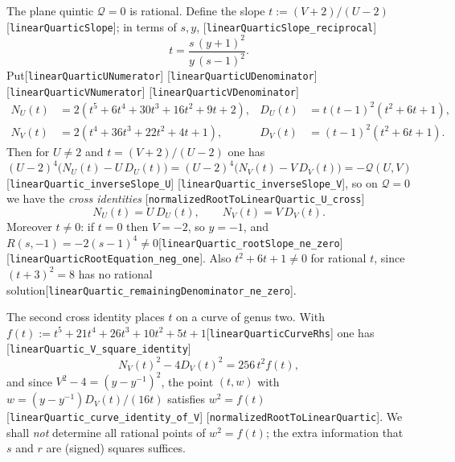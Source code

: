 \documentclass[10pt]{article}
\theoremstyle{definition}
\theoremstyle{remark}
\newcommand{\leanref}[1]{{\scriptsize\textup{[\texttt{#1}]}}\allowbreak}
\begin{document}
The plane quintic $\mathcal{Q}=0$ is rational.  Define the slope
$t:=(V+2)/(U-2)$\leanref{linear\allowbreak Quartic\allowbreak Slope}; in terms of $s,y$,
\leanref{linear\allowbreak Quartic\allowbreak Slope\_\allowbreak reciprocal}
\begin{equation}\label{eq:slope}
 t=\frac{s\,(y+1)^2}{y\,(s-1)^2}.
\end{equation}
Put\leanref{linear\allowbreak Quartic\allowbreak UNumerator} \leanref{linear\allowbreak Quartic\allowbreak UDenominator} \leanref{linear\allowbreak Quartic\allowbreak VNumerator} \leanref{linear\allowbreak Quartic\allowbreak VDenominator}
\begin{align*}
N_U(t)&=2(t^5+6t^4+30t^3+16t^2+9t+2), & D_U(t)&=t(t-1)^2(t^2+6t+1),\\
N_V(t)&=2(t^4+36t^3+22t^2+4t+1), & D_V(t)&=(t-1)^2(t^2+6t+1).
\end{align*}
Then for $U\ne2$ and $t=(V+2)/(U-2)$ one has
$(U-2)^4\bigl(N_U(t)-U\,D_U(t)\bigr)=(U-2)^4\bigl(N_V(t)-V\,D_V(t)\bigr)=-\mathcal{Q}(U,V)$
\leanref{linear\allowbreak Quartic\_\allowbreak inverse\allowbreak Slope\_\allowbreak U} \leanref{linear\allowbreak Quartic\_\allowbreak inverse\allowbreak Slope\_\allowbreak V},
so on $\mathcal{Q}=0$ we have the \emph{cross identities}
\leanref{normalized\allowbreak Root\allowbreak To\allowbreak Linear\allowbreak Quartic\_\allowbreak U\_\allowbreak cross}
\begin{equation}\label{eq:cross}
 N_U(t)=U\,D_U(t),\qquad N_V(t)=V\,D_V(t).
\end{equation}
Moreover $t\ne0$: if $t=0$ then $V=-2$, so $y=-1$, and
$R(s,-1)=-2(s-1)^4\ne0$\leanref{linear\allowbreak Quartic\_\allowbreak root\allowbreak Slope\_\allowbreak ne\_\allowbreak zero} \leanref{linear\allowbreak Quartic\allowbreak Root\allowbreak Equation\_\allowbreak neg\_\allowbreak one}.
Also $t^2+6t+1\ne0$ for rational $t$, since $(t+3)^2=8$ has no rational
solution\leanref{linear\allowbreak Quartic\_\allowbreak remaining\allowbreak Denominator\_\allowbreak ne\_\allowbreak zero}.

The second cross identity places $t$ on a curve of genus two.  With
$f(t):=t^5+21t^4+26t^3+10t^2+5t+1$\leanref{linear\allowbreak Quartic\allowbreak Curve\allowbreak Rhs} one has
\leanref{linear\allowbreak Quartic\_\allowbreak V\_\allowbreak square\_\allowbreak identity}
\begin{equation}\label{eq:NV}
 N_V(t)^2-4D_V(t)^2=256\,t^2 f(t),
\end{equation}
and since $V^2-4=(y-y^{-1})^2$, the point
$(t,w)$ with $w=(y-y^{-1})D_V(t)/(16t)$ satisfies
$w^2=f(t)$\leanref{linear\allowbreak Quartic\_\allowbreak curve\_\allowbreak identity\_\allowbreak of\_\allowbreak V} \leanref{normalized\allowbreak Root\allowbreak To\allowbreak Linear\allowbreak Quartic}.
We shall \emph{not} determine all rational points of $w^2=f(t)$; the extra
information that $s$ and $r$ are (signed) squares suffices.
\end{document}
